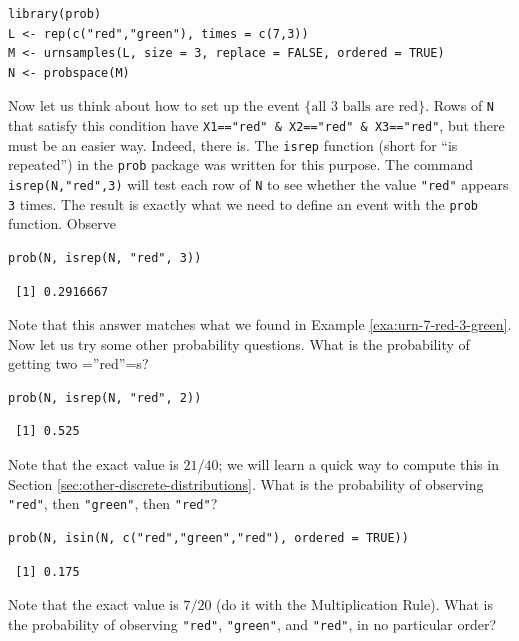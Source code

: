 \documentclass[captions=tableheading]{scrbook}
\begin{document}
\begin{verbatim}
library(prob)
L <- rep(c("red","green"), times = c(7,3))
M <- urnsamples(L, size = 3, replace = FALSE, ordered = TRUE)
N <- probspace(M)
\end{verbatim}

Now let us think about how to set up the event \(\{ \mbox{all 3 balls are red}\} \). Rows of \texttt{N} that satisfy this condition have \texttt{X1=="red" \& X2=="red" \& X3=="red"}, but there must be an easier way. Indeed, there is. The \texttt{isrep} function (short for ``is repeated'') in the \texttt{prob} package was written for this purpose. The command \texttt{isrep(N,"red",3)} will test each row of \texttt{N} to see whether the value \texttt{"red"} appears \texttt{3} times. The result is exactly what we need to define an event with the \texttt{prob} function. Observe


\begin{verbatim}
prob(N, isrep(N, "red", 3))
\end{verbatim}

\begin{verbatim}
 [1] 0.2916667
\end{verbatim}

Note that this answer matches what we found in Example \ref{exa:urn-7-red-3-green}. Now let us try some other probability questions. What is the probability of getting two =''red''=s?


\begin{verbatim}
prob(N, isrep(N, "red", 2))
\end{verbatim}

\begin{verbatim}
 [1] 0.525
\end{verbatim}

Note that the exact value is \(21/40\); we will learn a quick way to compute this in Section \ref{sec:other-discrete-distributions}. What is the probability of observing \texttt{"red"}, then \texttt{"green"}, then \texttt{"red"}?


\begin{verbatim}
prob(N, isin(N, c("red","green","red"), ordered = TRUE))
\end{verbatim}

\begin{verbatim}
 [1] 0.175
\end{verbatim}

Note that the exact value is \(7/20\) (do it with the Multiplication Rule). What is the probability of observing \texttt{"red"}, \texttt{"green"}, and \texttt{"red"}, in no particular order?
\end{document}
